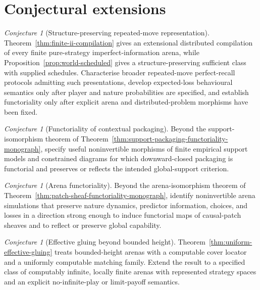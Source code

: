 \documentclass[11pt]{article}
\theoremstyle{plain}
\theoremstyle{definition}
\theoremstyle{remark}
\newtheorem{conjecture}[theorem]{Conjecture}
\begin{document}
\section{Conjectural extensions}\label{sec:conjectures}

\begin{conjecture}[Structure-preserving repeated-move representation]
\label{conj:imperfect}
Theorem~\ref{thm:finite-ii-compilation} gives an extensional distributed
compilation of every finite pure-strategy imperfect-information arena, while
Proposition~\ref{prop:world-scheduled} gives a structure-preserving sufficient
class with supplied schedules. Characterise broader repeated-move perfect-recall
protocols admitting such presentations, develop expected-loss behavioural
semantics only after player and nature probabilities are specified, and
establish functoriality only after explicit arena and distributed-problem
morphisms have been fixed.
\end{conjecture}

\begin{conjecture}[Functoriality of contextual packaging]\label{conj:context}
Beyond the support-isomorphism theorem of
Theorem~\ref{thm:support-packaging-functoriality-monograph}, specify useful
noninvertible morphisms of finite empirical support models and constrained
diagrams for which downward-closed packaging is functorial and preserves or
reflects the intended global-support criterion.
\end{conjecture}

\begin{conjecture}[Arena functoriality]\label{conj:arena-functor}
Beyond the arena-isomorphism theorem of
Theorem~\ref{thm:patch-sheaf-functoriality-monograph}, identify noninvertible
arena simulations that preserve nature dynamics, predictor information, choices,
and losses in a direction strong enough to induce functorial maps of causal-patch
sheaves and to reflect or preserve global capability.
\end{conjecture}

\begin{conjecture}[Effective gluing beyond bounded height]
\label{conj:effective-gluing}
Theorem~\ref{thm:uniform-effective-gluing} treats bounded-height arenas with a
computable cover locator and a uniformly computable matching family. Extend the
result to a specified class of computably infinite, locally finite arenas with
represented strategy spaces and an explicit no-infinite-play or limit-payoff
semantics.
\end{conjecture}
\end{document}
